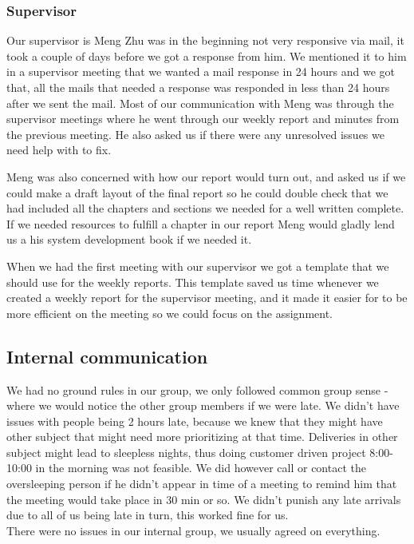 \subsubsection{Supervisor}
Our supervisor is Meng Zhu was in the beginning not very responsive via mail, it took a couple of days before we got a response from him. We mentioned it to him in a supervisor meeting that we wanted a mail response in 24 hours and we got that, all the mails that needed a response was responded in less than 24 hours after we sent the mail. Most of our communication with Meng was through the supervisor meetings where he went through our weekly report and minutes from the previous meeting. He also asked us if there were any unresolved issues we need help with to fix. 

Meng was also concerned with how our report would turn out, and asked us if we could make a draft layout of the final report so he could double check that we had included all the chapters and sections we needed for a well written complete. If we needed resources to fulfill a chapter in our report Meng would gladly lend us a his system development book if we needed it. 

When we had the first meeting with our supervisor we got a template that we should use for the weekly reports. This template saved us time whenever we created a weekly report for the supervisor meeting, and it made it easier for to be more efficient on the meeting so we could focus on the assignment.

\subsection{Internal communication}
We had no ground rules in our group, we only followed common group sense - where we would notice the other group members if we were late. We didn't have issues with people being 2 hours late, because we knew that they might have other subject that might need more prioritizing at that time. Deliveries in other subject might lead to sleepless nights, thus doing customer driven project 8:00-10:00 in the morning was not feasible. We did however call or contact the oversleeping person if he didn't appear in time of a meeting to remind him that the meeting would take place in 30 min or so.
We didn't punish any late arrivals due to all of us being late in turn, this worked fine for us.\\
There were no issues in our internal group, we usually agreed on everything.


